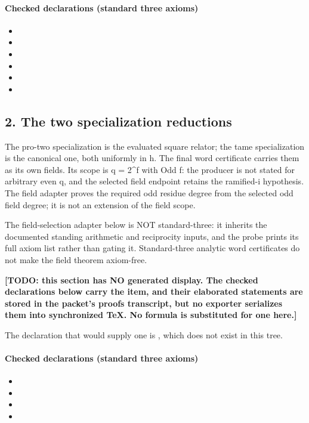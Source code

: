 \paragraph{Checked declarations (standard three axioms)}
\begin{itemize}
\item {}
\item {}
\item {}
\item {}
\item {}
\item {}
\end{itemize}

\subsection*{2. The two specialization reductions}
The pro-two specialization is the evaluated square relator; the tame specialization is the canonical one, both uniformly in h. The final word certificate carries them as its own fields. Its scope is q = 2\textasciicircum{}f with Odd f: the producer is not stated for arbitrary even q, and the selected field endpoint retains the ramified-i hypothesis. The field adapter proves the required odd residue degree from the selected odd field degree; it is not an extension of the field scope.

The field-selection adapter below is NOT standard-three: it inherits the documented standing arithmetic and reciprocity inputs, and the probe prints its full axiom list rather than gating it. Standard-three analytic word certificates do not make the field theorem axiom-free.

\par\noindent\textbf{[TODO: this section has NO generated display. The checked declarations below carry the item, and their elaborated statements are stored in the packet's proofs transcript, but no exporter serializes them into synchronized TeX. No formula is substituted for one here.]}
\par\noindent The declaration that would supply one is , which does not exist in this tree.
\paragraph{Checked declarations (standard three axioms)}
\begin{itemize}
\item {}
\item {}
\item {}
\item {}
\end{itemize}
